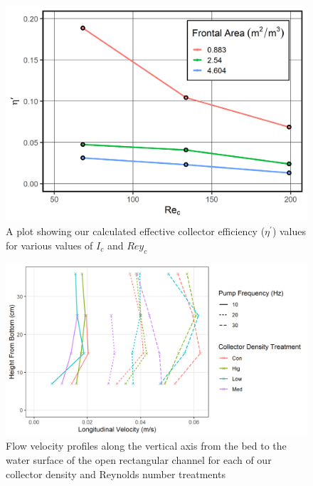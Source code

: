\documentclass{scrreprt}
\newcommand\Rey{\mathrm{Re}}
\begin{document}
\begin{figure}[htbp]
\includegraphics[width=6in]{etafig.png}
\centering
\caption{A plot showing our calculated effective collector efficiency ($\eta^\prime$) values for various values of $I_c$ and $Rey_c$}
\label{fig:vectrino}
\end{figure}

\begin{figure}[htbp]
\includegraphics[width=6in]{vectrino.png}
\centering
\caption{Flow velocity profiles along the vertical axis from the bed to the water surface of the open rectangular channel for each of our collector density and Reynolds number treatments}
\label{fig:vectrino}
\end{figure}



%
%



\end{document}
